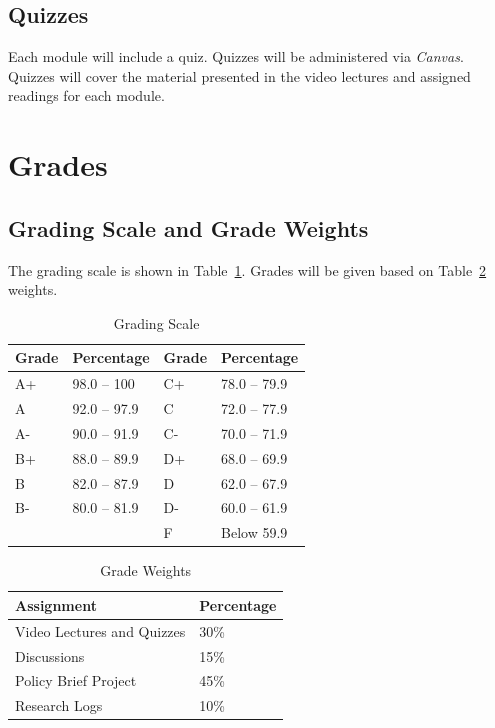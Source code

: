 \documentclass[11pt, letterpaper]{article}
\begin{document}
\subsection*{Quizzes}

Each module will include a quiz. Quizzes will be administered via \emph{Canvas}. Quizzes will cover the material presented in the video lectures and assigned readings for each module.

\section{Grades}

\subsection*{Grading Scale and Grade Weights}  

The grading scale is shown in Table~\ref{tab:grading-scale}. Grades will be given based on Table~\ref{tab:grade-weights} weights.

\begin{table}[ht]
\centering
\caption{Grading Scale}
\begin{tabular}{llll}
\toprule
\textbf{Grade} & \textbf{Percentage} & \textbf{Grade} & \textbf{Percentage} \\ \hline
        A+ & 98.0 -- 100  & C+ & 78.0 -- 79.9 \\
        A  & 92.0 -- 97.9 & C  & 72.0 -- 77.9 \\
        A- & 90.0 -- 91.9 & C- & 70.0 -- 71.9 \\
        B+ & 88.0 -- 89.9 & D+ & 68.0 -- 69.9 \\
        B  & 82.0 -- 87.9 & D  & 62.0 -- 67.9 \\
        B- & 80.0 -- 81.9 & D- & 60.0 -- 61.9 \\
           &              & F  & Below 59.9   \\
\bottomrule
\end{tabular}
\label{tab:grading-scale}
\end{table}

\begin{table}[ht]
    \centering
    \caption{Grade Weights}
    \begin{tabular}{ll}
        \toprule
    \textbf{Assignment} & \textbf{Percentage} \\
    \midrule
    Video Lectures and Quizzes & 30\% \\
    Discussions & 15\% \\
    Policy Brief Project & 45\% \\
    Research Logs & 10\% \\
    \bottomrule
    \end{tabular}
    \label{tab:grade-weights}
    \end{table}
\end{document}
